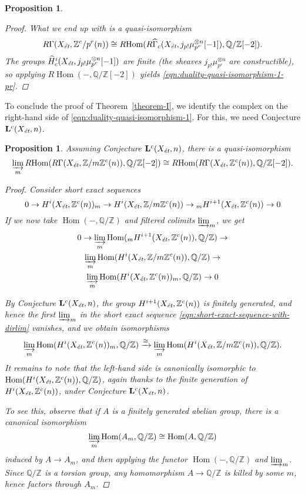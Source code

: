 \documentclass[leqno,12pt]{article}
\theoremstyle{plain}
\newtheorem{proposition}[theorem]{\indent\sc Proposition}
\theoremstyle{definition}
\DeclareMathOperator{\Hom}{Hom}
\newcommand{\QQ}{\mathbb{Q}}
\newcommand{\ZZ}{\mathbb{Z}}
\newcommand{\et}{\text{\it \'{e}t}}
\newcommand{\RHom}{R\!\Hom}
\begin{document}
\begin{proposition}
\begin{proof}
    What we end up with is a quasi-isomorphism
    \[ R\Gamma (X_\et, \ZZ^c/p^r (n)) \cong \RHom (R\widehat{\Gamma}_c (X_\et,
      j_{p !} \mu_{p^r}^{\otimes n} [-1]), \QQ/\ZZ [-2]). \]
    The groups $\widehat{H}^i_c (X_\et, j_{p!} \mu_{p^r}^{\otimes n} [-1])$ are
    finite (the sheaves $j_{p!} \mu_{p^r}^{\otimes n}$ are constructible),
    so applying $\RHom (-,\QQ/\ZZ [-2])$ yields
    \eqref{eqn:duality-quasi-isomorphism-1-pr}.
  \end{proof}
\end{proposition}

To conclude the proof of Theorem~\ref{theorem-I}, we identify the complex on the
right-hand side of \eqref{eqn:duality-quasi-isomorphism-1}. For this, we need
Conjecture $\mathbf{L}^c (X_\et, n)$.

\begin{proposition}
  \label{prop:a-quasi-isomorphism-with-dirlim}
  Assuming Conjecture $\mathbf{L}^c (X_\et, n)$, there is
  a quasi-isomorphism
  \[ \varinjlim_m \RHom (R\Gamma (X_\et, \ZZ/m\ZZ^c (n)), \QQ/\ZZ [-2]) \cong
    \RHom (R\Gamma (X_\et, \ZZ^c (n)), \QQ/\ZZ [-2]). \]

  \begin{proof}
    Consider short exact sequences
    \[ 0 \to H^i (X_\et, \ZZ^c (n))_m \to
      H^i (X_\et, \ZZ/m\ZZ^c (n)) \to
      {}_m H^{i+1} (X_\et, \ZZ^c (n)) \to 0 \]
    If we now take $\Hom (-,\QQ/\ZZ)$ and filtered colimits $\varinjlim_m$,
    we get
    \begin{multline}
      \label{eqn:short-exact-sequence-with-dirlim}
      0 \to \varinjlim_m \Hom ({}_m H^{i+1} (X_\et, \ZZ^c (n)), \QQ/\ZZ) \to \\
      \varinjlim_m \Hom (H^i (X_\et, \ZZ/m\ZZ^c (n)), \QQ/\ZZ) \to \\
      \varinjlim_m \Hom (H^i (X_\et, \ZZ^c (n))_m, \QQ/\ZZ) \to 0
    \end{multline}

    By Conjecture $\mathbf{L}^c (X_\et, n)$, the group
    $H^{i+1} (X_\et, \ZZ^c (n))$ is finitely generated, and hence
    the first $\varinjlim_m$ in the short exact sequence
    \eqref{eqn:short-exact-sequence-with-dirlim} vanishes, and we obtain
    isomorphisms
    \[ \varinjlim_m \Hom (H^i (X_\et, \ZZ^c (n))_m, \QQ/\ZZ) \xrightarrow{\cong}
      \varinjlim_m \Hom (H^i (X_\et, \ZZ/m\ZZ^c (n)), \QQ/\ZZ). \]
    It remains to note that the left-hand side is canonically isomorphic to
    $\Hom (H^i (X_\et, \ZZ^c (n)), \QQ/\ZZ)$, again thanks to the finite
    generation of $H^i (X_\et, \ZZ^c (n))$, under Conjecture
    $\mathbf{L}^c (X_\et, n)$.

    To see this, observe that if $A$ is a finitely generated abelian group,
    there is a canonical isomorphism
    $$\varinjlim_m \Hom (A_m, \QQ/\ZZ) \cong \Hom (A, \QQ/\ZZ)$$
    induced by $A \to A_m$, and then applying the functor $\Hom (-, \QQ/\ZZ)$
    and $\varinjlim_m$. Since $\QQ/\ZZ$ is a torsion group, any homomorphism
    $A\to \QQ/\ZZ$ is killed by some $m$, hence factors through $A_m$.
  \end{proof}
\end{proposition}
\end{document}
